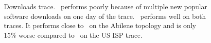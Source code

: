 {\begin{figure}[t]
\begin{center}
\end{center}
\vspace{-0.2in}
\caption{Downloads trace.  \optrp\ performs poorly because of multiple new popular software downloads on one day of the trace.  \invlru\ performs well on both traces. It performs close to \optrpfuture\  on the Abilene topology and is only 15\% worse compared to \optrpfuture\ on the  US-ISP trace.}
\label{fig:softwaredownloads}
\end{figure}

}
